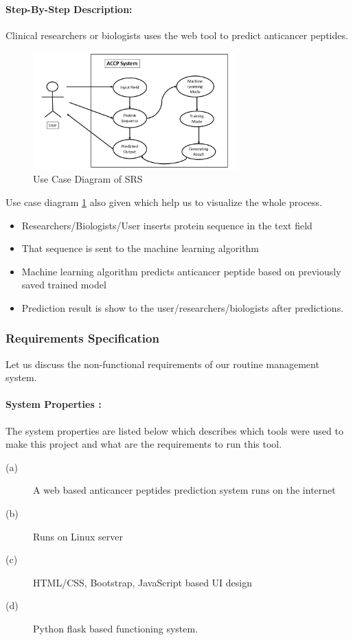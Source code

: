 \paragraph{Step-By-Step Description:}
Clinical researchers or biologists uses the web tool to predict anticancer peptides. 
\begin{figure}[H]
\centering
 \includegraphics[width=0.7\textwidth]{useCase.PNG}
 \caption{Use Case Diagram of SRS}
 \label{fig:useCase}
\end{figure}
Use case diagram \ref{fig:useCase} also given which help us to visualize the whole process.
\begin{itemize}
\item Researchers/Biologists/User inserts protein sequence in the text field
\item That sequence is sent to the machine learning algorithm
\item Machine learning algorithm predicts anticancer peptide based on previously saved trained model
\item Prediction result is show to the user/researchers/biologists after predictions.
\end{itemize}

\subsubsection{Requirements Specification}
Let us discuss the non-functional requirements of our routine management system.
\paragraph{System Properties :}
The system properties are listed below which describes which tools were used to make this project and what are the requirements to run this tool.

\begin{description}
\item[(a)] A web based anticancer peptides prediction system runs on the internet
\item[(b)] Runs on Linux server
\item[(c)] HTML/CSS, Bootstrap, JavaScript based UI design
\item[(d)] Python flask based functioning system.
\end{description}
